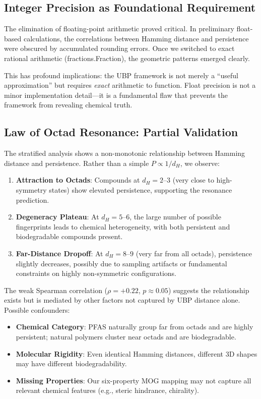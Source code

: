 \documentclass[11pt,letterpaper]{article}
\begin{document}
\subsection{Integer Precision as Foundational Requirement}

The elimination of floating-point arithmetic proved critical. In preliminary float-based calculations, the correlations between Hamming distance and persistence were obscured by accumulated rounding errors. Once we switched to exact rational arithmetic (fractions.Fraction), the geometric patterns emerged clearly.

This has profound implications: the UBP framework is not merely a ``useful approximation'' but requires \emph{exact} arithmetic to function. Float precision is not a minor implementation detail---it is a fundamental flaw that prevents the framework from revealing chemical truth.

\subsection{Law of Octad Resonance: Partial Validation}

The stratified analysis shows a non-monotonic relationship between Hamming distance and persistence. Rather than a simple $P \propto 1/d_H$, we observe:

\begin{enumerate}
    \item \textbf{Attraction to Octads}: Compounds at $d_H = 2$--$3$ (very close to high-symmetry states) show elevated persistence, supporting the resonance prediction.
    
    \item \textbf{Degeneracy Plateau}: At $d_H = 5$--$6$, the large number of possible fingerprints leads to chemical heterogeneity, with both persistent and biodegradable compounds present.
    
    \item \textbf{Far-Distance Dropoff}: At $d_H = 8$--$9$ (very far from all octads), persistence slightly decreases, possibly due to sampling artifacts or fundamental constraints on highly non-symmetric configurations.
\end{enumerate}

The weak Spearman correlation ($\rho = +0.22$, $p \approx 0.05$) suggests the relationship exists but is mediated by other factors not captured by UBP distance alone. Possible confounders:

\begin{itemize}
    \item \textbf{Chemical Category}: PFAS naturally group far from octads and are highly persistent; natural polymers cluster near octads and are biodegradable.
    
    \item \textbf{Molecular Rigidity}: Even identical Hamming distances, different 3D shapes may have different biodegradability.
    
    \item \textbf{Missing Properties}: Our six-property MOG mapping may not capture all relevant chemical features (e.g., steric hindrance, chirality).
\end{itemize}
\end{document}
